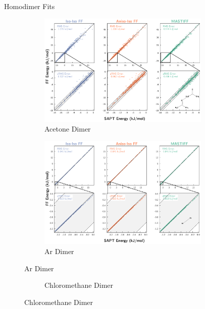 \begin{section}{Homodimer Fits}
\label{sec:mastiff-fits}

    \begin{figure}
    \begin{subfigure}{\textwidth}
        \caption{Acetone Dimer}
        \includegraphics[width=0.9\textwidth]{anisotropic/si/homodimer_figures/acetone_acetone_comparison.pdf}
    \end{subfigure}
    \begin{subfigure}{\textwidth}
        \caption{Ar Dimer}
        \includegraphics[width=0.9\textwidth]{anisotropic/si/homodimer_figures/ar_ar_comparison.pdf}
    \end{subfigure}
    \end{figure}
    \begin{figure}
    \ContinuedFloat
    \begin{subfigure}{\textwidth}
        \caption{Chloromethane Dimer}

\end{subfigure}
\end{figure}
\end{section}
